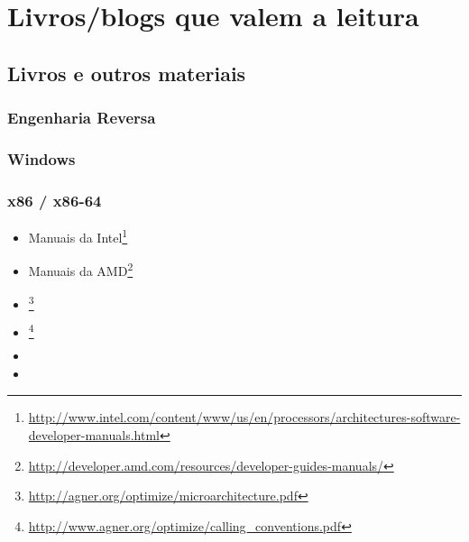 \chapter{Livros/blogs que valem a leitura}

\section{Livros e outros materiais}

\subsection{Engenharia Reversa}



\subsection{Windows}



\subsection{\CCpp}



\subsection{x86 / x86-64}

\label{x86_manuals}
\begin{itemize}
\item Manuais da Intel\footnote{\AlsoAvailableAs \url{http://www.intel.com/content/www/us/en/processors/architectures-software-developer-manuals.html}}

\item Manuais da AMD\footnote{\AlsoAvailableAs \url{http://developer.amd.com/resources/developer-guides-manuals/}}

\item \AgnerFog{}\footnote{\AlsoAvailableAs \url{http://agner.org/optimize/microarchitecture.pdf}}

\item \AgnerFogCC{}\footnote{\AlsoAvailableAs \url{http://www.agner.org/optimize/calling_conventions.pdf}}

\item \IntelOptimization

\item \AMDOptimization
\end{itemize}


